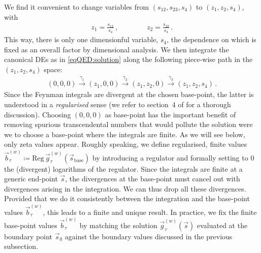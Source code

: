 \documentclass[main.tex]{subfiles}
\begin{document}
We find it convenient to change variables from $(s_{12},s_{23},s_4)$ to $(z_1,z_2,s_4)$, with
\begin{align}
z_1 = \frac{s_{12}}{s_4} \,, \qquad \qquad z_2 = \frac{s_{23}}{s_4} \,.
\end{align}
This way, there is only one dimensionful variable, $s_4$, the dependence on which is fixed as an overall factor by dimensional analysis.
We then integrate the canonical DEs as in \cref{eqQED:solution} along the following piece-wise path in the $(z_1,z_2,s_4)$ space:
\begin{align} \label{eqQED:path}
(0,0,0) \overset{\gamma_1}{\longrightarrow} (z_1, 0, 0)  \overset{\gamma_2}{\longrightarrow} (z_1, z_2, 0)  \overset{\gamma_3}{\longrightarrow} (z_1, z_2, s_4) \,.
\end{align}
Since the Feynman integrals are divergent at the chosen base-point, the latter is understood in a \emph{regularised} sense (we refer to section~4 of  for a thorough discussion).
Choosing $(0,0,0)$ as base-point has the important benefit of removing spurious transcendental numbers that would pollute the solution were we to choose a base-point where the integrals are finite. As we will see below, only zeta values appear.
Roughly speaking, we define regularised, finite values $\vec{b}^{(w)}_{\tau} \coloneqq \mathrm{Reg} \, \vec{g}^{(w)}_{\tau}(\vec{s}_{\mathrm{base}})$ by introducing a regulator and formally setting to $0$ the (divergent) logarithms of the regulator.
Since the integrals are finite at a generic end-point $\vec{s}$, the divergences at the base-point must cancel out with divergences arising in the integration. We can thus drop all these divergences. Provided that we do it consistently between the integration and the base-point values $\vec{b}^{(w)}_{\tau}$, this leads to a finite and unique result. In practice, we fix the finite base-point values $\vec{b}^{(w)}_{\tau}$ by matching the solution $\vec{g}^{(w)}_{\tau}(\vec{s})$ evaluated at the boundary point $\vec{s}_0$ against the boundary values discussed in the previous subsection. 
\end{document}
